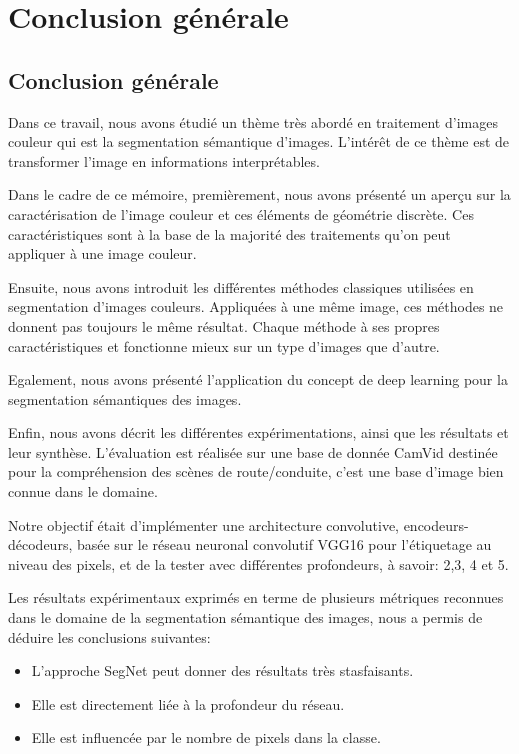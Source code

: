 \chapter*{Conclusion générale}
\newpage
\pagestyle{fancy}
\fancyhead[L]{}
\renewcommand{\headrulewidth}{1pt}
\fancyfoot[C]{\thepage}
\section*{Conclusion générale}
Dans ce travail, nous avons étudié un thème très abordé en traitement d’images couleur qui est la segmentation sémantique d’images. L’intérêt de ce thème est de transformer l’image en informations interprétables.

Dans le cadre de ce mémoire, premièrement, nous avons présenté un aperçu sur la caractérisation de l’image couleur et ces éléments de géométrie discrète. Ces caractéristiques sont à la base de la majorité des traitements qu’on peut appliquer à une image couleur.

Ensuite, nous avons introduit les différentes méthodes classiques utilisées en segmentation d’images couleurs. Appliquées à une même image, ces méthodes ne donnent pas toujours le même résultat. Chaque méthode à ses propres caractéristiques et fonctionne mieux sur un type d’images que d’autre. 

Egalement, nous avons présenté l’application du concept de deep learning pour la segmentation sémantiques des images. 

Enfin, nous avons décrit les différentes expérimentations, ainsi que les résultats et leur synthèse. L'évaluation est réalisée sur une base de donnée CamVid destinée pour la compréhension des scènes de route/conduite, c'est une base d'image bien connue dans le domaine. 

Notre objectif était d'implémenter une architecture convolutive, encodeurs-décodeurs, basée sur le réseau neuronal convolutif VGG16 pour l'étiquetage au niveau des pixels, et de la tester avec différentes profondeurs, à savoir: 2,3, 4 et 5.

Les résultats expérimentaux exprimés en terme de plusieurs métriques reconnues dans le domaine de la segmentation sémantique des images, nous a permis de déduire les conclusions suivantes: 

\begin{itemize}
\item L'approche SegNet peut donner des résultats très stasfaisants.
\item Elle est directement liée à la profondeur du réseau.
\item Elle est influencée par le nombre de pixels dans la classe.
\end{itemize} 

